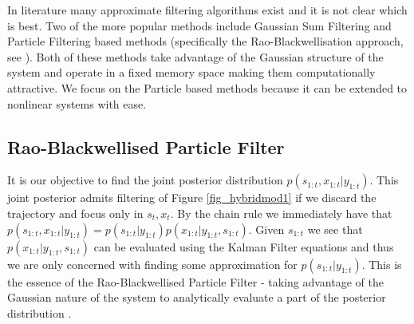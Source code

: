 In literature many approximate filtering algorithms exist and it is not clear which is best. Two of the more popular methods include Gaussian Sum Filtering \cite{barber2} and Particle Filtering based methods (specifically the Rao-Blackwellisation approach, see \cite{chen}\cite{doucet}). Both of these methods take advantage of the Gaussian structure of the system and operate in a fixed memory space making them computationally attractive. We focus on the Particle based methods because it can be extended to nonlinear systems with ease.   

\subsection{Rao-Blackwellised Particle Filter}
It is our objective to find the joint posterior distribution $p(s_{1:t}, x_{1:t}|y_{1:t})$. This joint posterior admits filtering of Figure \ref{fig_hybridmod1} if we discard the trajectory and focus only in $s_t,x_t$. By the chain rule we immediately have that $p(s_{1:t}, x_{1:t}|y_{1:t}) = p(s_{1:t}|y_{1:t})p(x_{1:t}|y_{1:t}, s_{1:t})$. Given $s_{1:t}$ we see that $p(x_{1:t}|y_{1:t}, s_{1:t})$ can be evaluated using the Kalman Filter equations and thus we are only concerned with finding some approximation for $p(s_{1:t}|y_{1:t})$. This is the essence of the Rao-Blackwellised Particle Filter - taking advantage of the Gaussian nature of the system to analytically evaluate a part of the posterior distribution \cite{doucet}.

